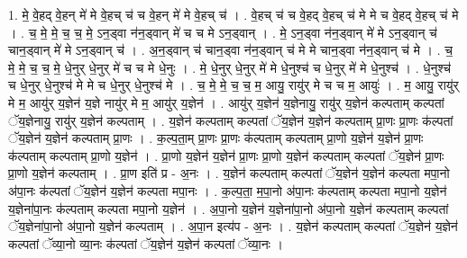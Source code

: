 \documentclass[17pt]{extarticle}
\begin{document}
1. मे॒ वे॒हद् वे॒हन् मे॑ मे वे॒हच् च॑ च वे॒हन् मे॑ मे वे॒हच् च॑ । . वे॒हच् च॑ च वे॒हद् वे॒हच् च॑ मे मे च वे॒हद् वे॒हच् च॑ मे । . च॒ मे॒ मे॒ च॒ च॒ मे॒ ऽन॒ड्वा न॑न॒ड्वान् मे॑ च च मे ऽन॒ड्वान् । . मे॒ ऽन॒ड्वा न॑न॒ड्वान् मे॑ मे ऽन॒ड्वान् च॑ चान॒ड्वान् मे॑ मे ऽन॒ड्वान् च॑ । . अ॒न॒ड्वान् च॑ चान॒ड्वा न॑न॒ड्वान् च॑ मे मे चान॒ड्वा न॑न॒ड्वान् च॑ मे । . च॒ मे॒ मे॒ च॒ च॒ मे॒ धे॒नुर् धे॒नुर् मे॑ च च मे धे॒नुः । . मे॒ धे॒नुर् धे॒नुर् मे॑ मे धे॒नुश्च॑ च धे॒नुर् मे॑ मे धे॒नुश्च॑ । . धे॒नुश्च॑ च धे॒नुर् धे॒नुश्च॑ मे मे च धे॒नुर् धे॒नुश्च॑ मे । . च॒ मे॒ मे॒ च॒ च॒ म॒ आयु॒ रायु॑र् मे च च म॒ आयुः॑ । . म॒ आयु॒ रायु॑र् मे म॒ आयु॑र् य॒ज्ञेन॑ य॒ज्ञे नायु॑र् मे म॒ आयु॑र् य॒ज्ञेन॑ । . आयु॑र् य॒ज्ञेन॑ य॒ज्ञेनायु॒ रायु॑र् य॒ज्ञेन॑ कल्पताम् कल्पतां ॅय॒ज्ञेनायु॒ रायु॑र् य॒ज्ञेन॑ कल्पताम् । . य॒ज्ञेन॑ कल्पताम् कल्पतां ॅय॒ज्ञेन॑ य॒ज्ञेन॑ कल्पताम् प्रा॒णः प्रा॒णः क॑ल्पतां ॅय॒ज्ञेन॑ य॒ज्ञेन॑ कल्पताम् प्रा॒णः । . क॒ल्प॒ता॒म् प्रा॒णः प्रा॒णः क॑ल्पताम् कल्पताम् प्रा॒णो य॒ज्ञेन॑ य॒ज्ञेन॑ प्रा॒णः क॑ल्पताम् कल्पताम् प्रा॒णो य॒ज्ञेन॑ । . प्रा॒णो य॒ज्ञेन॑ य॒ज्ञेन॑ प्रा॒णः प्रा॒णो य॒ज्ञेन॑ कल्पताम् कल्पतां ॅय॒ज्ञेन॑ प्रा॒णः प्रा॒णो य॒ज्ञेन॑ कल्पताम् । . प्रा॒ण इति॑ प्र - अ॒नः । . य॒ज्ञेन॑ कल्पताम् कल्पतां ॅय॒ज्ञेन॑ य॒ज्ञेन॑ कल्पता मपा॒नो अ॑पा॒नः क॑ल्पतां ॅय॒ज्ञेन॑ य॒ज्ञेन॑ कल्पता मपा॒नः । . क॒ल्प॒ता॒ म॒पा॒नो अ॑पा॒नः क॑ल्पताम् कल्पता मपा॒नो य॒ज्ञेन॑ य॒ज्ञेना॑पा॒नः क॑ल्पताम् कल्पता मपा॒नो य॒ज्ञेन॑ । . अ॒पा॒नो य॒ज्ञेन॑ य॒ज्ञेना॑पा॒नो अ॑पा॒नो य॒ज्ञेन॑ कल्पताम् कल्पतां ॅय॒ज्ञेना॑पा॒नो अ॑पा॒नो य॒ज्ञेन॑ कल्पताम् । . अ॒पा॒न इत्य॑प - अ॒नः । . य॒ज्ञेन॑ कल्पताम् कल्पतां ॅय॒ज्ञेन॑ य॒ज्ञेन॑ कल्पतां ॅव्या॒नो व्या॒नः क॑ल्पतां ॅय॒ज्ञेन॑ य॒ज्ञेन॑ कल्पतां ॅव्या॒नः । \newline
\end{document}
